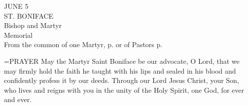 \begin{center}\normalsize JUNE 5\\
\footnotesize ST. BONIFACE\\
\footnotesize Bishop and Martyr\\
\footnotesize Memorial\\
\footnotesize From the common of one Martyr, p.    or of Pastors p. \\
\end{center}

\hangindent=\parindent \small{PRAYER 
May the Martyr Saint Boniface be our advocate, O Lord,
that we may firmly hold the faith
he taught with his lips and sealed in his blood
and confidently profess it by our deeds.
Through our Lord Jesus Christ, your Son,
who lives and reigns with you in the unity of the Holy Spirit,
one God, for ever and ever.\\}
 
